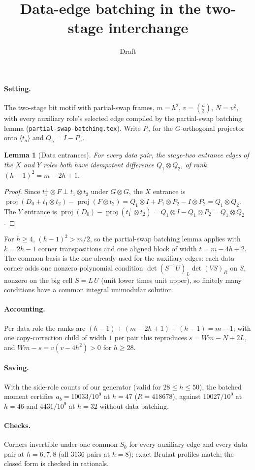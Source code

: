 \documentclass[11pt]{article}
\title{Data-edge batching in the two-stage interchange}
\date{Draft}
\newtheorem{lemma}{Lemma}
\begin{document}
\maketitle

\paragraph{Setting.} The two-stage bit motif with partial-swap frames, $m=h^2$, $v=\binom h3$, $N=v^2$, with
every auxiliary role's selected edge compiled by the partial-swap batching lemma
(\texttt{partial-swap-batching.tex}). Write $P_a$ for the $G$-orthogonal projector onto $\langle t_a\rangle$ and
$Q_a=I-P_a$.

\begin{lemma}[Data entrances]
For every data pair, the stage-two entrance edges of the $X$ and $Y$ roles both have idempotent difference
$Q_1\otimes Q_2$, of rank $(h-1)^2=m-2h+1$.
\end{lemma}
\begin{proof}
Since $t_1^\perp\otimes F\perp t_1\otimes t_2$ under $G\otimes G$, the $X$ entrance is
$\operatorname{proj}(D_0+t_1\otimes t_2)-\operatorname{proj}(F\otimes t_2)=Q_1\otimes I+P_1\otimes P_2-I\otimes P_2=Q_1\otimes Q_2$.
The $Y$ entrance is $\operatorname{proj}(D_0)-\operatorname{proj}(t_1^\perp\otimes t_2)=Q_1\otimes I-Q_1\otimes P_2=Q_1\otimes Q_2$.
\end{proof}

For $h\ge4$, $(h-1)^2>m/2$, so the partial-swap batching lemma applies with $k=2h-1$ corner transpositions and
one aligned block of width $t=m-4h+2$. The common basis is the one already used for the auxiliary edges: each
data corner adds one nonzero polynomial condition $\det(S^{-1}U)_L\det(VS)_R$ on $S$, nonzero on the big cell
$S=L\,U$ (unit lower times unit upper), so finitely many conditions have a common integral unimodular solution.

\paragraph{Accounting.} Per data role the ranks are $(h-1)+(m-2h+1)+(h-1)=m-1$; with one copy-correction child
of width $1$ per pair this reproduces $s=Wm-N+2L$, and $Wm-s=v(v-4h^2)>0$ for $h\ge28$.

\paragraph{Saving.} With the side-role counts of our generator (valid for $28\le h\le50$), the batched moment
certifies $a_b=10033/10^9$ at $h=47$ ($R=418678$), against $10027/10^9$ at $h=46$ and $4431/10^9$ at $h=32$
without data batching.

\paragraph{Checks.} Corners invertible under one common $S_0$ for every auxiliary edge and every data pair at
$h=6,7,8$ (all $3136$ pairs at $h=8$); exact Bruhat profiles match; the closed form is checked in rationals.
\end{document}
